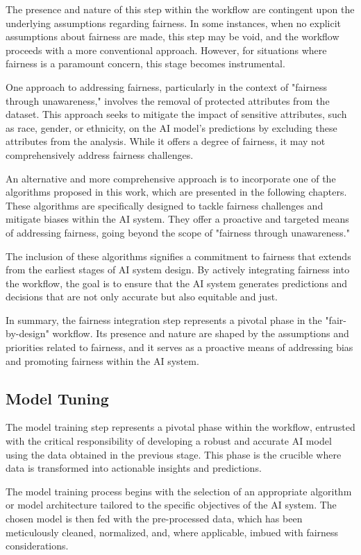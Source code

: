 \documentclass[12pt,a4paper,openright,twoside]{book}
\begin{document}
The presence and nature of this step within the workflow are contingent upon the underlying assumptions regarding fairness. In some instances, when no explicit assumptions about fairness are made, this step may be void, and the workflow proceeds with a more conventional approach. However, for situations where fairness is a paramount concern, this stage becomes instrumental. 

One approach to addressing fairness, particularly in the context of "fairness through unawareness," involves the removal of protected attributes from the dataset. This approach seeks to mitigate the impact of sensitive attributes, such as race, gender, or ethnicity, on the AI model's predictions by excluding these attributes from the analysis. While it offers a degree of fairness, it may not comprehensively address fairness challenges. 

An alternative and more comprehensive approach is to incorporate one of the algorithms proposed in this work, which are presented in the following chapters. These algorithms are specifically designed to tackle fairness challenges and mitigate biases within the AI system. They offer a proactive and targeted means of addressing fairness, going beyond the scope of "fairness through unawareness." 

The inclusion of these algorithms signifies a commitment to fairness that extends from the earliest stages of AI system design. By actively integrating fairness into the workflow, the goal is to ensure that the AI system generates predictions and decisions that are not only accurate but also equitable and just. 

In summary, the fairness integration step represents a pivotal phase in the "fair-by-design" workflow. Its presence and nature are shaped by the assumptions and priorities related to fairness, and it serves as a proactive means of addressing bias and promoting fairness within the AI system.

\subsection{Model Tuning}
The model training step represents a pivotal phase within the workflow, entrusted with the critical responsibility of developing a robust and accurate AI model using the data obtained in the previous stage. This phase is the crucible where data is transformed into actionable insights and predictions. 

The model training process begins with the selection of an appropriate algorithm or model architecture tailored to the specific objectives of the AI system. The chosen model is then fed with the pre-processed data, which has been meticulously cleaned, normalized, and, where applicable, imbued with fairness considerations. 
\end{document}
